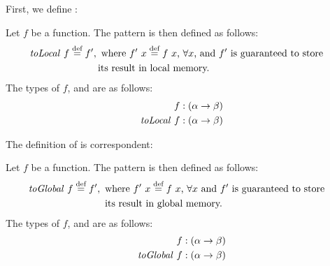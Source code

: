 First, we define \toLocal:
\begin{definition}
  \label{definition:pattern:toLocal}
  Let $f$ be a function.
  The \toLocal pattern is then defined as follows:
  \begin{align*}
    \text{\textit{toLocal}}\ f &\stackrel{\textrm{\scriptsize def}}{=} f',
    \begin{aligned}[t]
      &\text{ where $f'\ x \stackrel{\textrm{\scriptsize def}}{=} f\ x$, $\forall x$, and  $f'$ is guaranteed to store}\\
      &\text{its result in local memory.}
    \end{aligned}
  \end{align*}
  The types of $f$, and \toLocal are as follows:
  \begin{align*}
    f &: (\alpha \rightarrow \beta)\\
    \text{\textit{toLocal}}\ f &: (\alpha \rightarrow \beta)
  \end{align*}
\end{definition}

\noindent
The definition of \toGlobal is correspondent:
\begin{definition}
  \label{definition:pattern:toGlobal}
  Let $f$ be a function.
  The \toGlobal pattern is then defined as follows:
  \begin{align*}
    \text{\textit{toGlobal}}\ f &\stackrel{\textrm{\scriptsize def}}{=} f',
    \begin{aligned}[t]
      &\text{ where $f'\ x \stackrel{\textrm{\scriptsize def}}{=} f\ x$, $\forall x$ and $f'$ is guaranteed to store}\\
      &\text{ its result in global memory.}
    \end{aligned}
  \end{align*}
  The types of $f$, and \toGlobal are as follows:
  \begin{align*}
    f &: (\alpha \rightarrow \beta)\\
    \text{\textit{toGlobal}}\ f &: (\alpha \rightarrow \beta)
  \end{align*}
\end{definition}



